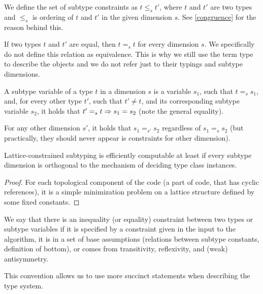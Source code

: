 \begin{defn}
    We define the set of subtype constraints as $t \leq_s t'$, where $t$ and $t'$ are two types and $\leq_s$ is ordering of $t$ and $t'$ in the given dimension $s$. See \cref{congruence} for the reason behind this.
\end{defn}

\begin{defn}
    If two types $t$ and $t'$ are equal, then $t =_s t$ for every dimension $s$. We specifically do not define this relation as equivalence. This is why we still use the term type to describe the objects and we do not refer just to their typings and subtype dimensions.
\end{defn}

\begin{defn}
    A subtype variable of a type $t$ in a dimension $s$  is a variable $s_1$, such that $t =_s s_1$, and, for every other type $t'$, such that $t' \neq t$, and its corresponding subtype variable $s_2$, it holds that $t' =_s t \Rightarrow s_1 = s_2$ (note the general equality).

    For any other dimension $s'$, it holds that $s_1 =_{s'} s_2$ regardless of $s_1 =_s s_2$ (but practically, they should never appear is constraints for other dimension).
\end{defn}

\begin{lemma}
    Lattice-constrained subtyping is efficiently computable at least if every subtype dimension is orthogonal to the mechanism of deciding type class instances.
\end{lemma}

\begin{proof}
    For each topological component of the code (a part of code, that has cyclic references), it is a simple minimization problem on a lattice structure defined by some fixed constants.
\end{proof}

\begin{defn}
    We say that there is an inequality (or equality) constraint between two types or subtype variables if it is specified by a constraint given in the input to the algorithm, it is in a set of base assumptions (relations between subtype constants, definition of bottom), or comes from transitivity, reflexivity, and (weak) antisymmetry.

    This convention allows us to use more succinct statements when describing the type system.
\end{defn}

